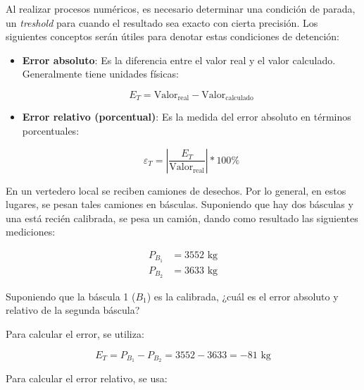 Al realizar procesos numéricos, es necesario determinar una condición de
parada, un \emph{treshold} para cuando el resultado sea exacto con
cierta precisión. Los siguientes conceptos serán útiles para denotar
estas condiciones de detención:

\begin{itemize}
    \item
        \textbf{Error absoluto}: Es la diferencia entre el valor real y el
        valor calculado. Generalmente tiene unidades físicas:

        \begin{equation*}{
                E_T = \text{Valor}_{\text{real}} - \text{Valor}_{\text{calculado}}
        }\end{equation*}
    \item
        \textbf{Error relativo (porcentual)}: Es la medida del error absoluto
        en términos porcentuales:

        \begin{equation*}{
                \varepsilon_{T} = \left| {\frac{E_T}{\text{Valor}_{\text{real}}}} \right| * 100 \%
        }\end{equation*}
\end{itemize}


\begin{ex}

    En un vertedero local se reciben camiones de desechos. Por lo general,
    en estos lugares, se pesan tales camiones en básculas. Suponiendo que
    hay dos básculas y una está recién calibrada, se pesa un camión, dando
    como resultado las siguientes mediciones:

    \begin{eqnarray*}
        P_{B_1} &= 3552\text{ kg}\\
        P_{B_2} &= 3633\text{ kg}
    \end{eqnarray*}

    Suponiendo que la báscula 1 (\(B_1\)) es la calibrada, ¿cuál es el error
    absoluto y relativo de la segunda báscula?

    \begin{solution}
        Para calcular el error, se utiliza:

        \begin{equation*}{
                E_T = P_{B_1} - P_{B_2} = 3552 - 3633 = -81 \text{ kg}
        }\end{equation*}

        Para calcular el error relativo, se usa:

        \begin{center}
        \end{center}

    \end{solution}


\end{ex}



